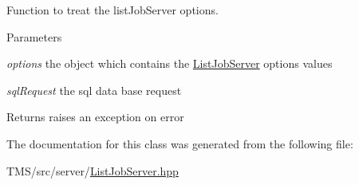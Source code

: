 Function to treat the listJobServer options. 


\begin{DoxyParams}{Parameters}
\item[{\em options}]the object which contains the \hyperlink{classListJobServer}{ListJobServer} options values \item[{\em sqlRequest}]the sql data base request \end{DoxyParams}
\begin{DoxyReturn}{Returns}
raises an exception on error 
\end{DoxyReturn}


The documentation for this class was generated from the following file:\begin{DoxyCompactItemize}
\item 
TMS/src/server/\hyperlink{ListJobServer_8hpp}{ListJobServer.hpp}\end{DoxyCompactItemize}
